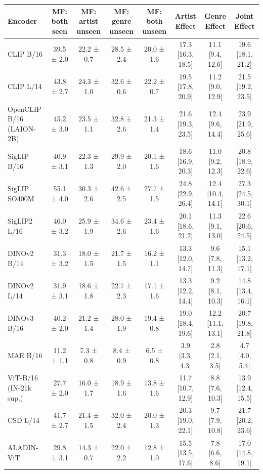 \begin{tabular}{lccccccc}
\toprule
Encoder & MF: both seen & MF: artist unseen & MF: genre unseen & MF: both unseen & Artist Effect & Genre Effect & Joint Effect \\
\midrule
CLIP B/16 & 39.5 ± 2.0 & 22.2 ± 0.7 & 28.5 ± 2.4 & 20.0 ± 1.6 & 17.3 [16.3, 18.5] & 11.1 [9.4, 12.6] & 19.6 [18.1, 21.2] \\
CLIP L/14 & 43.8 ± 2.7 & 24.3 ± 1.0 & 32.6 ± 0.6 & 22.2 ± 0.7 & 19.5 [17.8, 20.9] & 11.2 [9.0, 12.9] & 21.5 [19.2, 23.5] \\
OpenCLIP B/16 (LAION-2B) & 45.2 ± 3.0 & 23.5 ± 1.1 & 32.8 ± 2.6 & 21.3 ± 1.4 & 21.6 [19.3, 23.5] & 12.4 [9.6, 14.4] & 23.9 [21.9, 25.6] \\
SigLIP B/16 & 40.9 ± 3.1 & 22.3 ± 1.3 & 29.9 ± 2.0 & 20.1 ± 1.6 & 18.6 [16.9, 20.3] & 11.0 [9.2, 12.3] & 20.8 [18.9, 22.6] \\
SigLIP SO400M & 55.1 ± 4.0 & 30.3 ± 2.6 & 42.6 ± 2.5 & 27.7 ± 1.5 & 24.8 [22.9, 26.4] & 12.4 [10.4, 14.1] & 27.3 [24.5, 30.1] \\
SigLIP2 L/16 & 46.0 ± 3.2 & 25.9 ± 1.9 & 34.6 ± 2.6 & 23.4 ± 1.6 & 20.1 [18.6, 21.2] & 11.3 [9.1, 13.0] & 22.6 [20.6, 24.5] \\
DINOv2 B/14 & 31.3 ± 3.2 & 18.0 ± 1.5 & 21.7 ± 1.5 & 16.2 ± 1.1 & 13.3 [12.0, 14.7] & 9.6 [7.8, 11.3] & 15.1 [13.2, 17.1] \\
DINOv2 L/14 & 31.9 ± 3.1 & 18.6 ± 1.8 & 22.7 ± 2.3 & 17.1 ± 1.6 & 13.3 [12.2, 14.4] & 9.2 [8.1, 10.3] & 14.8 [13.4, 16.1] \\
DINOv3 B/16 & 40.2 ± 2.0 & 21.2 ± 1.4 & 28.0 ± 1.9 & 19.4 ± 0.8 & 19.0 [18.4, 19.6] & 12.2 [11.1, 13.1] & 20.7 [19.8, 21.8] \\
MAE B/16 & 11.2 ± 1.1 & 7.3 ± 0.8 & 8.4 ± 0.9 & 6.5 ± 0.8 & 3.9 [3.3, 4.3] & 2.8 [2.1, 3.5] & 4.7 [4.0, 5.4] \\
ViT-B/16 (IN-21k sup.) & 27.7 ± 2.0 & 16.0 ± 1.7 & 18.9 ± 1.6 & 13.8 ± 1.6 & 11.7 [10.7, 12.9] & 8.8 [7.6, 10.3] & 13.9 [12.4, 15.5] \\
CSD L/14 & 41.7 ± 2.7 & 21.4 ± 1.5 & 32.0 ± 2.4 & 20.0 ± 1.3 & 20.3 [19.0, 22.1] & 9.7 [7.9, 10.8] & 21.7 [20.2, 23.6] \\
ALADIN-ViT & 29.8 ± 3.1 & 14.3 ± 0.7 & 22.0 ± 2.2 & 12.8 ± 1.0 & 15.5 [13.5, 17.6] & 7.8 [6.6, 8.6] & 17.0 [14.8, 19.1] \\
\bottomrule
\end{tabular}
